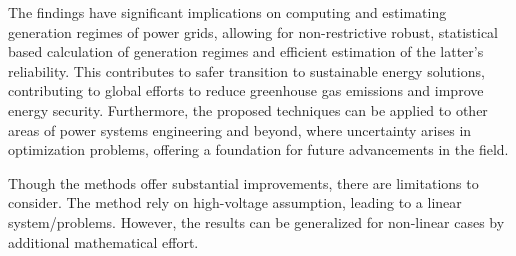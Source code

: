 
The findings have significant implications on computing and estimating generation regimes of power grids, allowing for non-restrictive robust, statistical based calculation of generation regimes and efficient estimation of the latter's reliability. This contributes to safer transition to sustainable energy solutions, contributing to global efforts to reduce greenhouse gas emissions and improve energy security. Furthermore, the proposed techniques can be applied to other areas of power systems engineering and beyond, where uncertainty arises in optimization problems, offering a foundation for future advancements in the field.



Though the methods offer substantial improvements, there are limitations to consider. The method rely on high-voltage assumption, leading to a linear system/problems. However, the results can be generalized for non-linear cases by additional mathematical effort.



